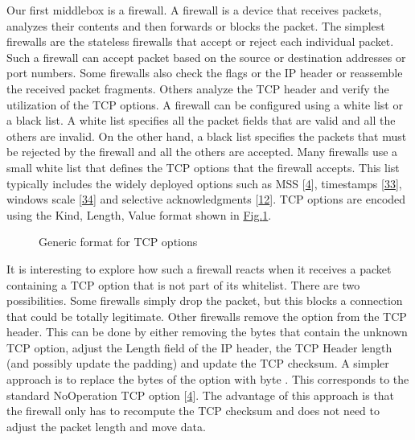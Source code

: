 \documentclass[letterpaper,10pt,english]{sphinxmanual}
\begin{document}
\sphinxAtStartPar
Our first middlebox is a firewall. A firewall is a device that receives packets, analyzes their contents and then forwards or blocks the packet. The simplest firewalls are the stateless firewalls that accept or reject each individual packet. Such a firewall can accept packet based on the source or destination addresses or port numbers. Some firewalls also check the flags or the IP header or reassemble the received packet fragments. Others analyze the TCP header and verify the utilization of the TCP options. A firewall can be configured using a white list or a black list. A white list specifies all the packet fields that are valid and all the others are invalid. On the other hand, a black list specifies the packets that must be rejected by the firewall and all the others are accepted. Many firewalls use a small white list that defines the TCP options that the firewall accepts. This list typically includes the widely deployed options such as MSS {[}\hyperlink{cite.biblio:id729}{4}{]}, timestamps {[}\hyperlink{cite.biblio:id7140}{33}{]}, windows scale {[}\hyperlink{cite.biblio:id1245}{34}{]} and selective acknowledgments {[}\hyperlink{cite.biblio:id1948}{12}{]}. TCP options are encoded using the Kind, Length, Value format shown in \hyperref[\detokenize{mptcp:fig-mptcp-tcp-option}]{Fig.\@ \ref{\detokenize{mptcp:fig-mptcp-tcp-option}}}.
\begin{figure}[htbp]\centering\capstart{}\caption{Generic format for TCP options}\label{\detokenize{mptcp:id76}}\label{\detokenize{mptcp:fig-mptcp-tcp-option}}\end{figure}
\sphinxAtStartPar
It is interesting to explore how such a firewall reacts when it receives a packet containing a TCP option that is not part of its whitelist. There are two possibilities. Some firewalls simply drop the packet, but this blocks a connection that could be totally legitimate. Other firewalls remove the option from the TCP header. This can be done by either removing the bytes that contain the unknown TCP option, adjust the Length field of the IP header, the TCP Header length (and possibly update the padding) and update the TCP checksum. A simpler approach is to replace the bytes of the option with byte . This corresponds to the standard No\sphinxhyphen{}Operation TCP option {[}\hyperlink{cite.biblio:id729}{4}{]}. The advantage of this approach is that the firewall only has to recompute the TCP checksum and does not need to adjust the packet length and move data.
\end{document}
